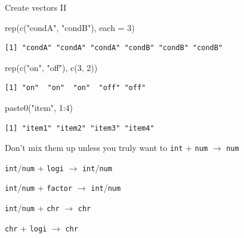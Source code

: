 \documentclass[
  ignorenonframetext,
]{beamer}
\newenvironment{Shaded}{\begin{snugshade}}{\end{snugshade}}
\newcommand{\AttributeTok}[1]{\textcolor[rgb]{0.00,0.34,0.68}{#1}}
\newcommand{\DecValTok}[1]{\textcolor[rgb]{0.69,0.50,0.00}{#1}}
\newcommand{\FunctionTok}[1]{\textcolor[rgb]{0.39,0.29,0.61}{#1}}
\newcommand{\NormalTok}[1]{\textcolor[rgb]{0.12,0.11,0.11}{#1}}
\newcommand{\SpecialCharTok}[1]{\textcolor[rgb]{0.24,0.68,0.91}{#1}}
\newcommand{\StringTok}[1]{\textcolor[rgb]{0.75,0.01,0.01}{#1}}
\begin{document}
\begin{frame}[fragile]{Create vectors II}
\protect\hypertarget{create-vectors-ii}{}
\begin{Shaded}
\begin{Highlighting}[]
\FunctionTok{rep}\NormalTok{(}\FunctionTok{c}\NormalTok{(}\StringTok{"condA"}\NormalTok{, }\StringTok{"condB"}\NormalTok{), }\AttributeTok{each =} \DecValTok{3}\NormalTok{)}
\end{Highlighting}
\end{Shaded}

\begin{verbatim}
[1] "condA" "condA" "condA" "condB" "condB" "condB"
\end{verbatim}

\begin{Shaded}
\begin{Highlighting}[]
\FunctionTok{rep}\NormalTok{(}\FunctionTok{c}\NormalTok{(}\StringTok{"on"}\NormalTok{, }\StringTok{"off"}\NormalTok{), }\FunctionTok{c}\NormalTok{(}\DecValTok{3}\NormalTok{, }\DecValTok{2}\NormalTok{))}
\end{Highlighting}
\end{Shaded}

\begin{verbatim}
[1] "on"  "on"  "on"  "off" "off"
\end{verbatim}

\begin{Shaded}
\begin{Highlighting}[]
\FunctionTok{paste0}\NormalTok{(}\StringTok{"item"}\NormalTok{, }\DecValTok{1}\SpecialCharTok{:}\DecValTok{4}\NormalTok{)}
\end{Highlighting}
\end{Shaded}

\begin{verbatim}
[1] "item1" "item2" "item3" "item4"
\end{verbatim}
\end{frame}

\begin{frame}[fragile]{Don't mix them up \small unless you truly want
to}
\protect\hypertarget{dont-mix-them-up-unless-you-truly-want-to}{}
\texttt{int} + \texttt{num} \(\rightarrow\) \texttt{num}

\texttt{int}/\texttt{num} + \texttt{logi} \(\rightarrow\)
\texttt{int}/\texttt{num}

\texttt{int}/\texttt{num} + \texttt{factor} \(\rightarrow\)
\texttt{int}/\texttt{num}

\texttt{int}/\texttt{num} + \texttt{chr} \(\rightarrow\) \texttt{chr}

\texttt{chr} + \texttt{logi} \(\rightarrow\) \texttt{chr}
\end{frame}
\end{document}
